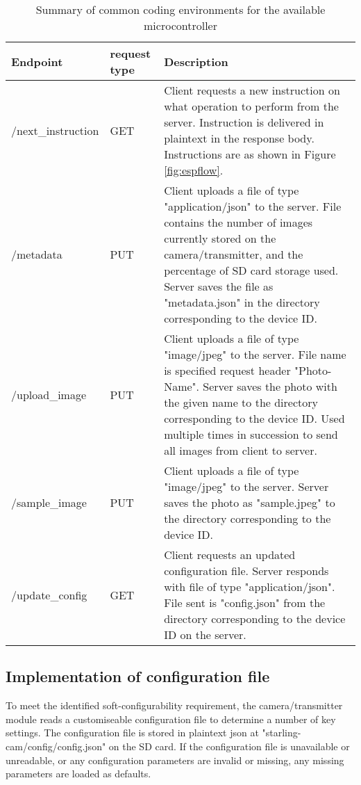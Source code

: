 \documentclass[class=report,11pt,crop=false]{standalone}
\begin{document}
\begin{table}[ht]
    \centering
    \begin{scriptsize}
    \begin{tabularx}{\textwidth}{|p{}|p{}|X|}
    \hline
    \textbf{Endpoint} & \textbf{request type} & \textbf{Description} \\ \hline
    /next\_instruction & GET & Client requests a new instruction on what operation to perform from the server. Instruction is delivered in plaintext in the response body. Instructions are as shown in Figure \ref{fig:espflow}. \\ \hline
    /metadata & PUT & Client uploads a file of type "application/json" to the server. File contains the number of images currently stored on the camera/transmitter, and the percentage of SD card storage used. Server saves the file as "metadata.json" in the directory corresponding to the device ID. \\ \hline
    /upload\_image & PUT & Client uploads a file of type "image/jpeg" to the server. File name is specified request header "Photo-Name". Server saves the photo with the given name to the directory corresponding to the device ID. Used multiple times in succession to send all images from client to server. \\ \hline
    /sample\_image & PUT & Client uploads a file of type "image/jpeg" to the server. Server saves the photo as "sample.jpeg" to the directory corresponding to the device ID. \\ \hline
    /update\_config & GET & Client requests an updated configuration file. Server responds with file of type "application/json". File sent is "config.json" from the directory corresponding to the device ID on the server. \\ \hline
    \end{tabularx}%
    \end{scriptsize}
    \caption{Summary of common coding environments for the available microcontroller}
    \label{tab:server-api}
\end{table}

\subsection{Implementation of configuration file}

To meet the identified soft-configurability requirement, the camera/transmitter module reads a customiseable configuration file to determine a number of key settings. The configuration file is stored in plaintext json at "starling-cam/config/config.json" on the SD card. If the configuration file is unavailable or unreadable, or any configuration parameters are invalid or missing, any missing parameters are loaded as defaults.
\end{document}
